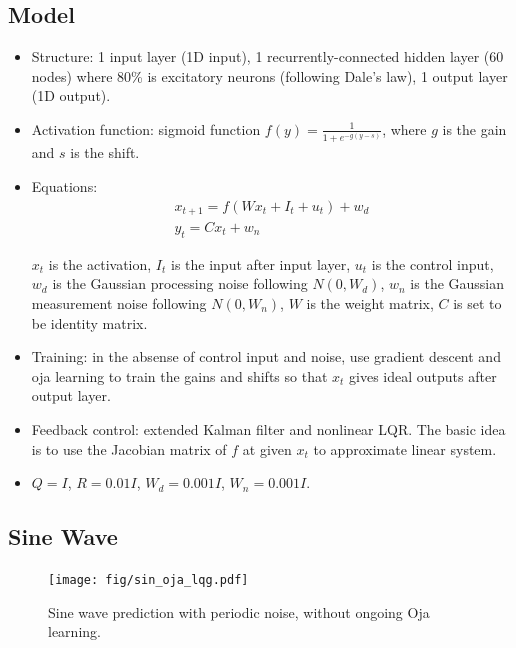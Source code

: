 \documentclass[12pt, a4paper]{article}
\begin{document}
\subsection*{Model}
\begin{itemize}
    \item Structure: 1 input layer (1D input), 1 recurrently-connected hidden layer (60 nodes) where 80\% is excitatory neurons (following Dale's law), 1 output layer (1D output). 

    \item Activation function: sigmoid function $f(y) = \frac{1}{1 + e^{-g(y-s)}}$, where $g$ is the gain and $s$ is the shift. 
    
    \item Equations: 
    \begin{eqnarray}
    \nonumber
    x_{t+1} = f(Wx_t + I_{t} + u_{t}) + w_d \\
    \nonumber
    y_t = Cx_{t} + w_n
    \end{eqnarray}
    
    $x_t$ is the activation, $I_t$ is the input after input layer, $u_t$ is the control input, $w_d$ is the Gaussian processing noise following $N(0,W_d)$, $w_n$ is the Gaussian measurement noise following $N(0,W_n)$, $W$ is the weight matrix, $C$ is set to be identity matrix.

    \item Training: in the absense of control input and noise, use gradient descent and oja learning to train the gains and shifts so that $x_t$ gives ideal outputs after output layer.

    \item Feedback control: extended Kalman filter and nonlinear LQR. The basic idea is to use the Jacobian matrix of $f$ at given $x_t$ to approximate linear system.
    
    \item $Q = I$, $R = 0.01I$, $W_d = 0.001I$, $W_n = 0.001I$.

\end{itemize}

\subsection*{Sine Wave}

\begin{figure}[H]
    \centering
    \texttt{[image: fig/sin\_oja\_lqg.pdf]}
    \caption{Sine wave prediction with periodic noise, without ongoing Oja learning.}
    \label{fig:1}
\end{figure}
\end{document}
